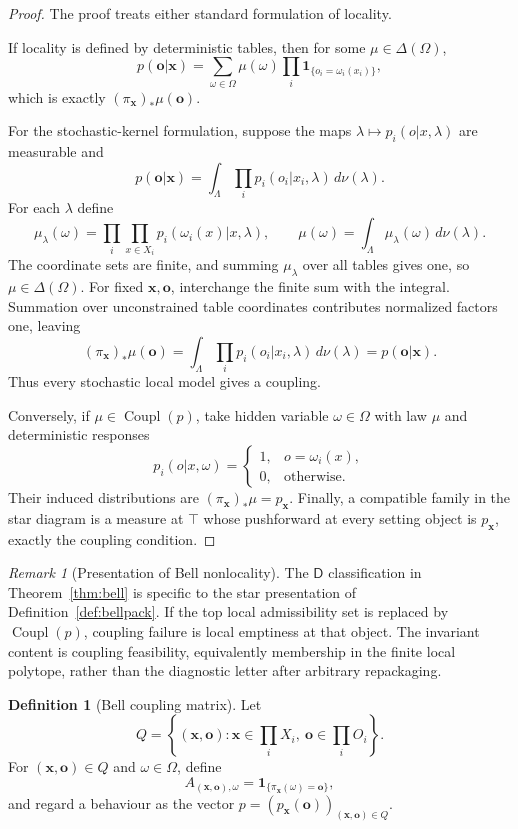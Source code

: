 \documentclass[11pt]{article}
\theoremstyle{plain}
\theoremstyle{definition}
\newtheorem{definition}[theorem]{Definition}
\theoremstyle{remark}
\newtheorem{remark}[theorem]{Remark}
\begin{document}
\begin{proof}
The proof treats either standard formulation of locality.

If locality is defined by deterministic tables, then for some
$\mu\in\Delta(\Omega)$,
\[
p(\mathbf o|\mathbf x)=
\sum_{\omega\in\Omega}\mu(\omega)
\prod_i\mathbf 1_{\{o_i=\omega_i(x_i)\}},
\]
which is exactly $(\pi_{\mathbf x})_*\mu(\mathbf o)$.

For the stochastic-kernel formulation, suppose the maps
$\lambda\mapsto p_i(o|x,\lambda)$ are measurable and
\[
p(\mathbf o|\mathbf x)=
\int_\Lambda\prod_i p_i(o_i|x_i,\lambda)\,d\nu(\lambda).
\]
For each $\lambda$ define
\[
\mu_\lambda(\omega)=
\prod_i\prod_{x\in X_i}p_i(\omega_i(x)|x,\lambda),
\qquad
\mu(\omega)=\int_\Lambda\mu_\lambda(\omega)\,d\nu(\lambda).
\]
The coordinate sets are finite, and summing $\mu_\lambda$ over all tables gives
one, so $\mu\in\Delta(\Omega)$. For fixed $\mathbf x,\mathbf o$, interchange
the finite sum with the integral. Summation over unconstrained table coordinates
contributes normalized factors one, leaving
\[
(\pi_{\mathbf x})_*\mu(\mathbf o)
=\int_\Lambda\prod_i p_i(o_i|x_i,\lambda)\,d\nu(\lambda)
=p(\mathbf o|\mathbf x).
\]
Thus every stochastic local model gives a coupling.

Conversely, if $\mu\in\operatorname{Coupl}(p)$, take hidden variable
$\omega\in\Omega$ with law $\mu$ and deterministic responses
\[
p_i(o|x,\omega)=
\begin{cases}1,&o=\omega_i(x),\\0,&\text{otherwise}.
\end{cases}
\]
Their induced distributions are $(\pi_{\mathbf x})_*\mu=p_{\mathbf x}$.
Finally, a compatible family in the star diagram is a measure at $\top$ whose
pushforward at every setting object is $p_{\mathbf x}$, exactly the coupling
condition.
\end{proof}

\begin{remark}[Presentation of Bell nonlocality]
The $\mathsf D$ classification in Theorem~\ref{thm:bell} is specific to the star
presentation of Definition~\ref{def:bellpack}. If the top local admissibility set
is replaced by $\operatorname{Coupl}(p)$, coupling failure is local emptiness at
that object. The invariant content is coupling feasibility, equivalently
membership in the finite local polytope, rather than the diagnostic letter after
arbitrary repackaging.
\end{remark}

\begin{definition}[Bell coupling matrix]\label{def:bell-matrix}
Let
\[
Q=\left\{(\mathbf x,\mathbf o):
\mathbf x\in\prod_iX_i,\ 
\mathbf o\in\prod_iO_i\right\}.
\]
For $(\mathbf x,\mathbf o)\in Q$ and $\omega\in\Omega$, define
\[
A_{(\mathbf x,\mathbf o),\omega}
=\mathbf 1_{\{\pi_{\mathbf x}(\omega)=\mathbf o\}},
\]
and regard a behaviour as the vector
$p=(p_{\mathbf x}(\mathbf o))_{(\mathbf x,\mathbf o)\in Q}$.
\end{definition}
\end{document}
